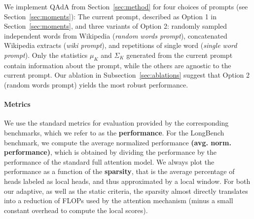 We implement QAdA from Section~\ref{sec:method} for four choices of prompts (see Section~\ref{sec:moments}): The current prompt, described as Option 1 in Section~\ref{sec:moments}, and three variants of Option 2:  randomly sampled independent words from Wikipedia (\textit{random words prompt}), concatenated Wikipedia extracts (\textit{wiki prompt}), and repetitions of single word (\textit{single word prompt}). Only the statistics $\mu_K$ and $\Sigma_K$ generated from  the current prompt contain information about the prompt, while the others are agnostic to the current prompt. Our ablation in Subsection~\ref{sec:ablations} suggest that Option 2 (random words prompt) yields the most robust performance. 

\paragraph{Metrics}
We use the standard metrics for evaluation provided by the corresponding benchmarks, which we refer to as the \textbf{performance}. For the LongBench benchmark, we compute the average normalized performance \textbf{(avg. norm. performance)}, which is obtained by dividing the performance by the performance of the standard full attention model. We always plot the performance as a function of the \textbf{sparsity}, that is the average percentage of heads labeled as local heads, and thus approximated by a local window. For both our adaptive, as well as the static criteria, the sparsity almost directly translates into a reduction of FLOPs used by the attention mechanism (minus a small constant overhead to compute the local scores). 









